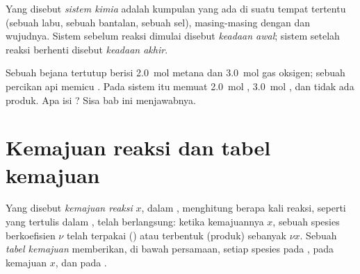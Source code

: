 \begin{definition}\label{def:g10:reaction-progress-table:system}
Yang disebut \emph{sistem kimia} adalah kumpulan
 yang ada di suatu tempat tertentu (sebuah labu, sebuah
bantalan, sebuah sel), masing-masing dengan  dan wujudnya.
Sistem sebelum reaksi dimulai disebut
\emph{keadaan awal}; sistem setelah reaksi berhenti
disebut \emph{keadaan akhir}.
\end{definition}


\begin{example}\label{ex:g10:reaction-progress-table:methane}
Sebuah bejana tertutup berisi \qty{2.0}{mol} metana dan \qty{3.0}{mol}
gas oksigen; sebuah percikan api memicu 
. Pada  sistem itu memuat
\qty{2.0}{mol} , \qty{3.0}{mol} , dan tidak ada
produk. Apa isi ? Sisa bab ini menjawabnya.
\end{example}

\section{Kemajuan reaksi dan tabel kemajuan}

\begin{definition}\label{def:g10:reaction-progress-table:extent}
Yang disebut \emph{kemajuan reaksi} $x$, dalam
, menghitung berapa kali reaksi, seperti yang tertulis dalam
, telah berlangsung: ketika kemajuannya $x$, sebuah
spesies berkoefisien $\nu$ telah terpakai () atau terbentuk
(produk) sebanyak $\nu x$. Sebuah
\emph{tabel kemajuan} memberikan, di bawah
persamaan,  setiap spesies pada , pada kemajuan
$x$, dan pada .
\end{definition}

